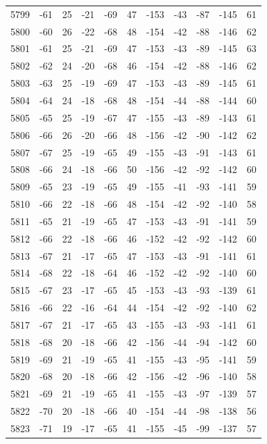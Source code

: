 \begin{table}[H]
\begin{tabular}{lllllllllll}
5799 & -61 & 25 & -21 & -69 & 47 & -153 & -43 & -87 & -145 & 61 \\
5800 & -60 & 26 & -22 & -68 & 48 & -154 & -42 & -88 & -146 & 62 \\
5801 & -61 & 25 & -21 & -69 & 47 & -153 & -43 & -89 & -145 & 63 \\
5802 & -62 & 24 & -20 & -68 & 46 & -154 & -42 & -88 & -146 & 62 \\
5803 & -63 & 25 & -19 & -69 & 47 & -153 & -43 & -89 & -145 & 61 \\
5804 & -64 & 24 & -18 & -68 & 48 & -154 & -44 & -88 & -144 & 60 \\
5805 & -65 & 25 & -19 & -67 & 47 & -155 & -43 & -89 & -143 & 61 \\
5806 & -66 & 26 & -20 & -66 & 48 & -156 & -42 & -90 & -142 & 62 \\
5807 & -67 & 25 & -19 & -65 & 49 & -155 & -43 & -91 & -143 & 61 \\
5808 & -66 & 24 & -18 & -66 & 50 & -156 & -42 & -92 & -142 & 60 \\
5809 & -65 & 23 & -19 & -65 & 49 & -155 & -41 & -93 & -141 & 59 \\
5810 & -66 & 22 & -18 & -66 & 48 & -154 & -42 & -92 & -140 & 58 \\
5811 & -65 & 21 & -19 & -65 & 47 & -153 & -43 & -91 & -141 & 59 \\
5812 & -66 & 22 & -18 & -66 & 46 & -152 & -42 & -92 & -142 & 60 \\
5813 & -67 & 21 & -17 & -65 & 47 & -153 & -43 & -91 & -141 & 61 \\
5814 & -68 & 22 & -18 & -64 & 46 & -152 & -42 & -92 & -140 & 60 \\
5815 & -67 & 23 & -17 & -65 & 45 & -153 & -43 & -93 & -139 & 61 \\
5816 & -66 & 22 & -16 & -64 & 44 & -154 & -42 & -92 & -140 & 62 \\
5817 & -67 & 21 & -17 & -65 & 43 & -155 & -43 & -93 & -141 & 61 \\
5818 & -68 & 20 & -18 & -66 & 42 & -156 & -44 & -94 & -142 & 60 \\
5819 & -69 & 21 & -19 & -65 & 41 & -155 & -43 & -95 & -141 & 59 \\
5820 & -68 & 20 & -18 & -66 & 42 & -156 & -42 & -96 & -140 & 58 \\
5821 & -69 & 21 & -19 & -65 & 41 & -155 & -43 & -97 & -139 & 57 \\
5822 & -70 & 20 & -18 & -66 & 40 & -154 & -44 & -98 & -138 & 56 \\
5823 & -71 & 19 & -17 & -65 & 41 & -155 & -45 & -99 & -137 & 57 \\

\end{tabular}
\end{table}
